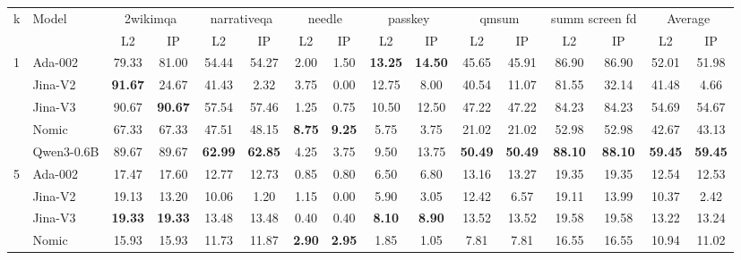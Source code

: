 \begin{sidewaystable}[htbp!]
\centering
\footnotesize
{}
\label{tab:detailed_precision}
\begin{tabular}{llcccccccccccccc}
\toprule
\multirow{2}{*}{k} & \multirow{2}{*}{Model} & \multicolumn{2}{c}{2wikimqa} & \multicolumn{2}{c}{narrativeqa} & \multicolumn{2}{c}{needle} & \multicolumn{2}{c}{passkey} & \multicolumn{2}{c}{qmsum} & \multicolumn{2}{c}{summ screen fd} & \multicolumn{2}{c}{Average} \\
\cmidrule(lr){3-4} \cmidrule(lr){5-6} \cmidrule(lr){7-8} \cmidrule(lr){9-10} \cmidrule(lr){11-12} \cmidrule(lr){13-14} \cmidrule(lr){15-16}
& & L2 & IP & L2 & IP & L2 & IP & L2 & IP & L2 & IP & L2 & IP & L2 & IP \\
\midrule
\multirow{5}{*}{1} & Ada-002 & 79.33 & 81.00 & 54.44 & 54.27 & 2.00 & 1.50 & \textbf{13.25} & \textbf{14.50} & 45.65 & 45.91 & 86.90 & 86.90 & 52.01 & 51.98 \\
& Jina-V2 & \textbf{91.67} & 24.67 & 41.43 & 2.32 & 3.75 & 0.00 & 12.75 & 8.00 & 40.54 & 11.07 & 81.55 & 32.14 & 41.48 & 4.66 \\
& Jina-V3 & 90.67 & \textbf{90.67} & 57.54 & 57.46 & 1.25 & 0.75 & 10.50 & 12.50 & 47.22 & 47.22 & 84.23 & 84.23 & 54.69 & 54.67 \\
& Nomic & 67.33 & 67.33 & 47.51 & 48.15 & \textbf{8.75} & \textbf{9.25} & 5.75 & 3.75 & 21.02 & 21.02 & 52.98 & 52.98 & 42.67 & 43.13 \\
& Qwen3-0.6B & 89.67 & 89.67 & \textbf{62.99} & \textbf{62.85} & 4.25 & 3.75 & 9.50 & 13.75 & \textbf{50.49} & \textbf{50.49} & \textbf{88.10} & \textbf{88.10} & \textbf{59.45} & \textbf{59.45} \\
\midrule
\multirow{5}{*}{5} & Ada-002 & 17.47 & 17.60 & 12.77 & 12.73 & 0.85 & 0.80 & 6.50 & 6.80 & 13.16 & 13.27 & 19.35 & 19.35 & 12.54 & 12.53 \\
& Jina-V2 & 19.13 & 13.20 & 10.06 & 1.20 & 1.15 & 0.00 & 5.90 & 3.05 & 12.42 & 6.57 & 19.11 & 13.99 & 10.37 & 2.42 \\
& Jina-V3 & \textbf{19.33} & \textbf{19.33} & 13.48 & 13.48 & 0.40 & 0.40 & \textbf{8.10} & \textbf{8.90} & 13.52 & 13.52 & 19.58 & 19.58 & 13.22 & 13.24 \\
& Nomic & 15.93 & 15.93 & 11.73 & 11.87 & \textbf{2.90} & \textbf{2.95} & 1.85 & 1.05 & 7.81 & 7.81 & 16.55 & 16.55 & 10.94 & 11.02 \\

\end{tabular}
\end{sidewaystable}
